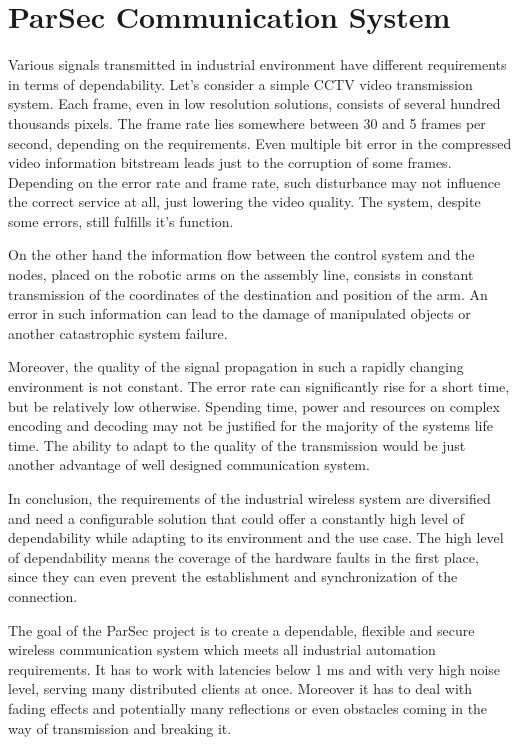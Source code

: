 \section {ParSec Communication System}
Various signals transmitted in industrial environment have different requirements in terms of dependability. Let's consider a simple CCTV video transmission system. Each frame, even in low resolution solutions, consists of several hundred thousands pixels. The frame rate lies somewhere between 30 and 5 frames per second, depending on the requirements. Even multiple bit error in the compressed video information bitstream leads just to the corruption of some frames. Depending on the error rate and frame rate, such disturbance may not influence the correct service at all, just lowering the video quality. The system, despite some errors, still fulfills it's function.

On the other hand the information flow between the control system and the nodes, placed on the robotic arms on the assembly line, consists in constant transmission of the coordinates of the destination and position of the arm. An error in such information can lead to the damage of manipulated objects or another catastrophic system failure.

Moreover, the quality of the signal propagation in such a rapidly changing environment is not constant. The error rate can significantly rise for a short time, but be relatively low otherwise. Spending time, power and resources on complex encoding and decoding may not be justified for the majority of the systems life time. The ability to adapt to the quality of the transmission would be just another advantage of well designed communication system.

In conclusion, the requirements of the industrial wireless system are diversified and need a configurable solution that could offer a constantly high level of dependability while adapting to its environment and the use case. The high level of dependability means the coverage of the hardware faults in the first place, since they can even prevent the establishment and synchronization of the connection.

The goal of the ParSec project is to create a dependable, flexible and secure wireless communication system which meets all industrial automation requirements. It has to work with latencies below 1 ms and with very high noise level, serving many distributed clients at once. Moreover it has to deal with fading effects and potentially many reflections or even obstacles coming in the way of transmission and breaking it.

